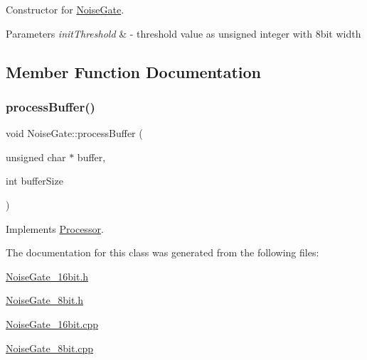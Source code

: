 Constructor for \hyperlink{classNoiseGate}{Noise\+Gate}. 
\begin{DoxyParams}{Parameters}
{\em init\+Threshold} & -\/ threshold value as unsigned integer with 8bit width \\
\hline
\end{DoxyParams}


\subsection{Member Function Documentation}
\mbox{\label{classNoiseGate_a319f4b7d435ed4a270e695cf7c529d24}} 
\subsubsection{\texorpdfstring{process\+Buffer()}{processBuffer()}}
{\footnotesize\ttfamily void Noise\+Gate\+::process\+Buffer (\begin{DoxyParamCaption}\item[{unsigned char $\ast$}]{buffer,  }\item[{int}]{buffer\+Size }\end{DoxyParamCaption})\hspace{0.3cm}{\ttfamily [virtual]}}



Implements \hyperlink{classProcessor_a401e57b59e43de9c4a51ca0f566d2948}{Processor}.



The documentation for this class was generated from the following files\+:\begin{DoxyCompactItemize}
\item 
\hyperlink{NoiseGate__16bit_8h}{Noise\+Gate\+\_\+16bit.\+h}\item 
\hyperlink{NoiseGate__8bit_8h}{Noise\+Gate\+\_\+8bit.\+h}\item 
\hyperlink{NoiseGate__16bit_8cpp}{Noise\+Gate\+\_\+16bit.\+cpp}\item 
\hyperlink{NoiseGate__8bit_8cpp}{Noise\+Gate\+\_\+8bit.\+cpp}\end{DoxyCompactItemize}
